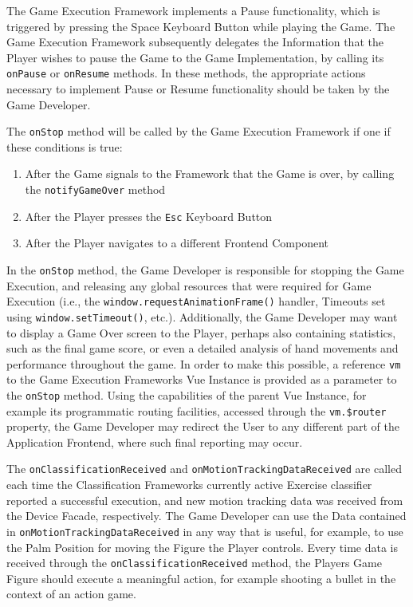 The Game Execution Framework implements a Pause functionality, which is triggered by pressing the Space Keyboard Button while playing the Game. The Game Execution Framework subsequently delegates the Information that the Player wishes to pause the Game to the Game Implementation, by calling its \texttt{onPause} or \texttt{onResume} methods. In these methods, the appropriate actions necessary to implement Pause or Resume functionality should be taken by the Game Developer.

The \texttt{onStop} method will be called by the Game Execution Framework if one if these conditions is true:

\begin{enumerate}
   \item After the Game signals to the Framework that the Game is over, by calling the \texttt{notifyGameOver} method
   \item After the Player presses the \texttt{Esc} Keyboard Button
   \item After the Player navigates to a different Frontend Component 
\end{enumerate}

\noindent
In the \texttt{onStop} method, the Game Developer is responsible for stopping the Game Execution, and releasing any global resources that were required for Game Execution (i.e., the \texttt{window.requestAnimationFrame()} handler, Timeouts set using \texttt{window.setTimeout()}, etc.). Additionally, the Game Developer may want to display a Game Over screen to the Player, perhaps also containing statistics, such as the final game score, or even a detailed analysis of hand movements and performance throughout the game. In order to make this possible, a reference \texttt{vm} to the Game Execution Frameworks Vue Instance is provided as a parameter to the \texttt{onStop} method. Using the capabilities of the parent Vue Instance, for example its programmatic routing facilities, accessed through the \texttt{vm.\$router} property, the Game Developer may redirect the User to any different part of the Application Frontend, where such final reporting may occur.

The \texttt{onClassificationReceived} and \texttt{onMotionTrackingDataReceived} are called each time the Classification Frameworks currently active Exercise classifier reported a successful execution, and new motion tracking data was received from the Device Facade, respectively. The Game Developer can use the Data contained in \texttt{onMotionTrackingDataReceived} in any way that is useful, for example, to use the Palm Position for moving the Figure the Player controls. Every time data is received through the \texttt{onClassificationReceived} method, the Players Game Figure should execute a meaningful action, for example shooting a bullet in the context of an action game.

